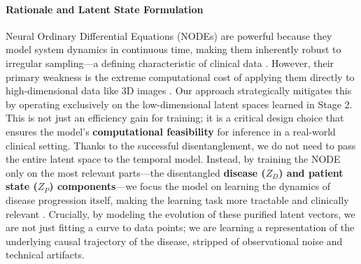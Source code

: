 \documentclass[11pt, a4paper]{article}
\begin{document}
\paragraph{Rationale and Latent State Formulation}
Neural Ordinary Differential Equations (NODEs) are powerful because they model system dynamics in continuous time, making them inherently robust to irregular sampling—a defining characteristic of clinical data \cite{GwakSim2020, JohnsonBulgarelli2023, BelogolovskyGreenberg2023}. However, their primary weakness is the extreme computational cost of applying them directly to high-dimensional data like 3D images \cite{WiewelBecher2018, DavisChoromanski2020}. Our approach strategically mitigates this by operating exclusively on the low-dimensional latent spaces learned in Stage 2. This is not just an efficiency gain for training; it is a critical design choice that ensures the model's \textbf{computational feasibility} for inference in a real-world clinical setting. Thanks to the successful disentanglement, we do not need to pass the entire latent space to the temporal model. Instead, by training the NODE only on the most relevant parts—the disentangled \textbf{disease ($Z_D$) and patient state ($Z_P$) components}—we focus the model on learning the dynamics of disease progression itself, making the learning task more tractable and clinically relevant \cite{AshmanSo2020, KberKalisch2023, LosadaTerranova2024}. Crucially, by modeling the evolution of these purified latent vectors, we are not just fitting a curve to data points; we are learning a representation of the underlying causal trajectory of the disease, stripped of observational noise and technical artifacts.
\end{document}
